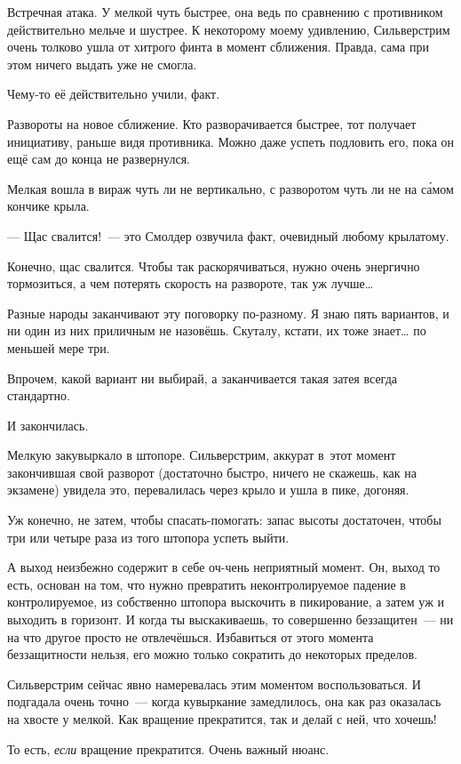 \documentclass[fontsize=11pt,a5paper,titlepage=firstcover]{scrbook}
\begin{document}
Встречная атака. У мелкой чуть быстрее, она ведь по сравнению с противником действительно мельче и шустрее. К некоторому моему удивлению, Сильверстрим очень толково ушла от хитрого финта в момент сближения. Правда, сама при этом ничего выдать уже не смогла.

Чему-то её действительно учили, факт.

Развороты на новое сближение. Кто разворачивается быстрее, тот получает инициативу, раньше видя противника. Можно даже успеть подловить его, пока он ещё сам до конца не развернулся.

Мелкая вошла в вираж чуть ли не вертикально, с разворотом чуть ли не на са́мом кончике крыла.

--- Щас свалится!~--- это Смолдер озвучила факт, очевидный любому крылатому.

Конечно, щас свалится. Чтобы так раскорячиваться, нужно очень энергично тормозиться, а чем потерять скорость на развороте, так уж лучше{\ldots}

Разные народы заканчивают эту поговорку по-разному. Я знаю пять вариантов, и ни один из них приличным не назовёшь. Скуталу, кстати, их тоже знает{\ldots} по меньшей мере три.

Впрочем, какой вариант ни выбирай, а заканчивается такая затея всегда стандартно.

И закончилась.

Мелкую закувыркало в штопоре. Сильверстрим, аккурат в~этот момент закончившая свой разворот (достаточно быстро, ничего не скажешь, как на экзамене) увидела это, перевалилась через крыло и ушла в пике, догоняя.

Уж конечно, не затем, чтобы спасать-помогать: запас высоты достаточен, чтобы три или четыре раза из того штопора успеть выйти.

А выход неизбежно содержит в себе оч-чень неприятный момент. Он, выход то есть, основан на том, что нужно превратить неконтролируемое падение в контролируемое, из собственно штопора выскочить в пикирование, а затем уж и выходить в горизонт. И когда ты выскакиваешь, то совершенно беззащитен~--- ни на что другое просто не отвлечёшься. Избавиться от этого момента беззащитности нельзя, его можно только сократить до некоторых пределов.

Сильверстрим сейчас явно намеревалась этим моментом воспользоваться. И подгадала очень точно~--- когда кувыркание замедлилось, она как раз оказалась на хвосте у мелкой. Как вращение прекратится, так и делай с ней, что хочешь!

То есть, \emph{если} вращение прекратится. Очень важный нюанс.
\end{document}
